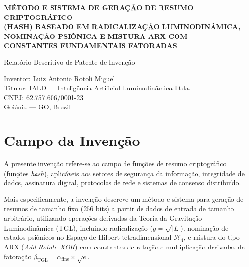 \documentclass[12pt,a4paper]{article}
\newcommand{\betatgl}{\beta_{\!\scriptscriptstyle\mathrm{TGL}}}
\newcommand{\afine}{\alpha_{\mathrm{fine}}}
\begin{document}

\begin{center}
{\Large\bfseries MÉTODO E SISTEMA DE GERAÇÃO DE RESUMO CRIPTOGRÁFICO \\
(HASH) BASEADO EM RADICALIZAÇÃO LUMINODINÂMICA, \\
NOMINAÇÃO PSIÔNICA E MISTURA ARX COM \\
CONSTANTES FUNDAMENTAIS FATORADAS}

\vspace{0.8cm}
{\large Relatório Descritivo de Patente de Invenção}

\vspace{0.5cm}
Inventor: Luiz Antonio Rotoli Miguel \\
Titular: IALD --- Inteligência Artificial Luminodinâmica Ltda. \\
CNPJ: 62.757.606/0001-23 \\
Goiânia --- GO, Brasil
\end{center}

\vspace{1cm}

\section{Campo da Invenção}

A presente invenção refere-se ao campo de funções de resumo criptográfico (funções \textit{hash}), aplicáveis aos setores de segurança da informação, integridade de dados, assinatura digital, protocolos de rede e sistemas de consenso distribuído.

Mais especificamente, a invenção descreve um método e sistema para geração de resumos de tamanho fixo (256 bits) a partir de dados de entrada de tamanho arbitrário, utilizando operações derivadas da Teoria da Gravitação Luminodinâmica (TGL), incluindo radicalização ($g = \sqrt{|L|}$), nominação de estados psiônicos no Espaço de Hilbert tetradimensional $\mathcal{H}_4$, e mistura do tipo ARX (\textit{Add-Rotate-XOR}) com constantes de rotação e multiplicação derivadas da fatoração $\betatgl = \afine \times \sqrt{e}$.

\end{document}
